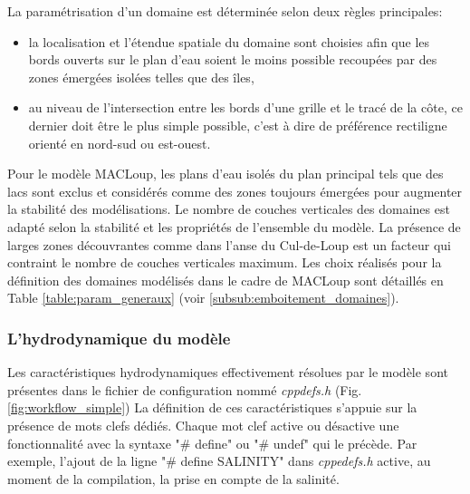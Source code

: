 \documentclass[10pt,a4paper,titlepage]{article}
\begin{document}
La paramétrisation d'un domaine est déterminée selon deux règles principales:
\begin{itemize}
	\item la localisation et l'étendue spatiale du domaine sont choisies afin que les bords ouverts sur le plan d'eau soient le moins possible recoupées par des zones émergées isolées telles que des îles,
	\item au niveau de l'intersection entre les bords d'une grille et le tracé de la côte, ce dernier doit être le plus simple possible, c'est à dire de préférence rectiligne orienté en nord-sud ou est-ouest.
\end{itemize}

Pour le modèle MACLoup, les plans d'eau isolés du plan principal tels que des lacs sont exclus et considérés comme des zones toujours émergées pour augmenter la stabilité des modélisations.
Le nombre de couches verticales des domaines est adapté selon la stabilité et les propriétés de l'ensemble du modèle.
La présence de larges zones découvrantes comme dans l'anse du Cul-de-Loup est un facteur qui contraint le nombre de couches verticales maximum.
Les choix réalisés pour la définition des domaines modélisés dans le cadre de MACLoup sont détaillés en Table \ref{table:param_generaux} (voir \ref{subsub:emboitement_domaines}).



\subsubsection{L'hydrodynamique du modèle}
\label{subsub:physique_modele}

Les caractéristiques hydrodynamiques effectivement résolues par le modèle sont présentes dans le fichier de configuration nommé \textit{cppdefs.h} (Fig. \ref{fig:workflow_simple})
La définition de ces caractéristiques s'appuie sur la présence de mots clefs dédiés.
Chaque mot clef active ou désactive une fonctionnalité avec la syntaxe "\# define"  ou "\# undef" qui le précède.
Par exemple, l'ajout de la ligne "\# define SALINITY" dans \textit{cppedefs.h} active, au moment de la compilation, la prise en compte de la salinité.


\end{document}
